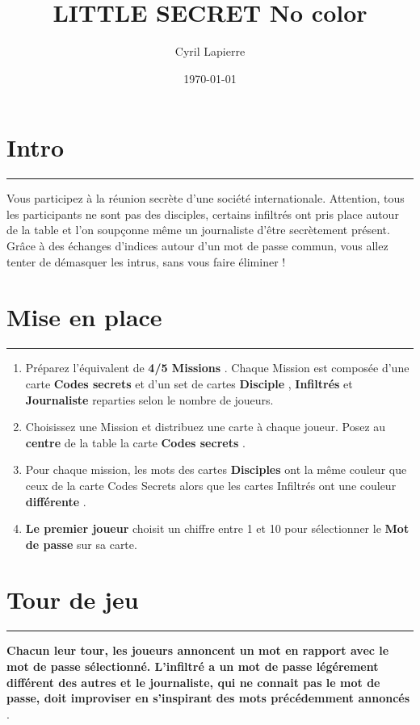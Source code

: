 \documentclass{article}%
\title{LITTLE SECRET No color}%
\author{Cyril Lapierre}%
\date{\today}%
\begin{document}
%
\normalsize%
\maketitle\thispagestyle{header}%
\pagestyle{header}%
\section{ Intro
}%
\label{sec:Intro}%
\rule{18cm}{0.07cm}\break%
Vous participez à la réunion secrète d'une société internationale. Attention, tous les participants ne sont pas des disciples, certains infiltrés ont pris place autour de la table et l'on soupçonne même un journaliste d'être secrètement présent. Grâce à des échanges d'indices autour d'un mot de passe commun, vous allez tenter de démasquer les intrus, sans vous faire éliminer !


%
\section{ Mise en place
}%
\label{sec:Miseenplace}%
\rule{18cm}{0.07cm}\break%
\begin{enumerate}%
\item%
%
 Préparez l'équivalent de %
\textbf{4/5 Missions}%
. Chaque Mission est composée d'une carte %
\textbf{Codes secrets}%
\textit{ }%
 et d'un set de cartes %
\textbf{Disciple}%
,%
\textbf{ Infiltrés}%
\textit{ }%
 et %
\textbf{Journaliste}%
\textit{ }%
 reparties selon le nombre de joueurs.
%
\item%
%
 Choisissez une Mission et distribuez une carte à chaque joueur. Posez au %
\textbf{centre}%
\textit{ }%
 de la table la carte %
\textbf{Codes secrets}%
.
%
\item%
%
 Pour chaque mission, les mots des cartes %
\textbf{Disciples}%
\textit{ }%
 ont la même couleur que ceux de la carte Codes Secrets alors que les cartes Infiltrés ont une couleur %
\textbf{différente}%
.
%
\item%
%
\textbf{Le premier joueur}%
\textit{ }%
 choisit un chiffre entre 1 et 10 pour sélectionner le %
\textbf{Mot de passe}%
\textit{ }%
 sur sa carte.
%
\end{enumerate}

%
\section{ Tour de jeu
}%
\label{sec:Tourdejeu}%
\rule{18cm}{0.07cm}\break%
\textbf{Chacun leur tour, les joueurs annoncent un mot en rapport avec le mot de passe sélectionné. L'infiltré a un mot de passe légérement différent des autres et le journaliste, qui ne connait pas le mot de passe, doit improviser en s'inspirant des mots précédemment annoncés}%
.
\end{document}
